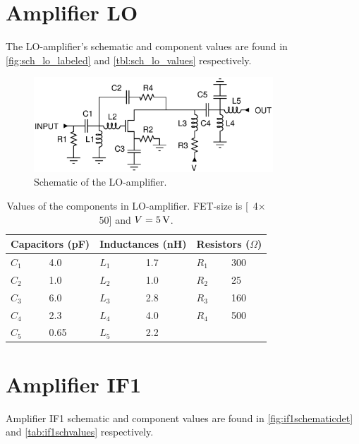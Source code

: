 	\newpage
	
	\section{Amplifier LO}
		The LO-amplifier's schematic and component values are found in \autoref{fig:sch_lo_labeled} and \autoref{tbl:sch_lo_values} respectively.
		
		\begin{figure}[hbt!]
			\centering
			\includegraphics[width=0.8\textwidth]{fig/amplifiers/lo/sch_lo_labeled}
			\caption[Amplifier LO schematic.]{Schematic of the LO-amplifier.}\label{fig:sch_lo_labeled}
		\end{figure}

		\begin{table}[hbt!]
			\caption[LO-amplifier component values.]{Values of the components in LO-amplifier. FET-size is \unit[4$\times$50]{\mum} and $V=\unit[5]{V}$.}
			\label{tbl:sch_lo_values}
			\centering
			\begin{tabular}{llllll}
				\multicolumn{2}{l}{Capacitors (pF)} & \multicolumn{2}{l}{Inductances (nH)} & \multicolumn{2}{l}{Resistors ($\Omega$)} \\\hline
				$C_1$ &  4.0 & $L_1$ & 1.7 & $R_1$ & 300 \\
				$C_2$ &  1.0 & $L_2$ & 1.0 & $R_2$ & 25 \\
				$C_3$ &  6.0 & $L_3$ & 2.8 & $R_3$ & 160 \\
				$C_4$ &  2.3  & $L_4$ & 4.0& $R_4$ & 500 \\
				$C_5$ &  0.65 & $L_5$ & 2.2 &  & 
			\end{tabular}
		\end{table}	

	\newpage	
	
	\section{Amplifier IF1}\label{sec:detif1sch}
		Amplifier IF1 schematic and component values are found in \autoref{fig:if1schematicdet} and \autoref{tab:if1schvalues} respectively.
		
